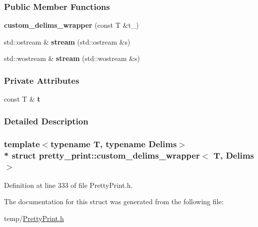 \subsubsection*{Public Member Functions}
\begin{DoxyCompactItemize}
\item 
{\bfseries custom\+\_\+delims\+\_\+wrapper} (const T \&t\+\_\+)\hypertarget{structpretty__print_1_1custom__delims__wrapper_a834f2b1779f2a832207def729955ee94}{}\label{structpretty__print_1_1custom__delims__wrapper_a834f2b1779f2a832207def729955ee94}

\item 
std\+::ostream \& {\bfseries stream} (std\+::ostream \&s)\hypertarget{structpretty__print_1_1custom__delims__wrapper_a29f5e10e26cf68312d14e2ecf446c42a}{}\label{structpretty__print_1_1custom__delims__wrapper_a29f5e10e26cf68312d14e2ecf446c42a}

\item 
std\+::wostream \& {\bfseries stream} (std\+::wostream \&s)\hypertarget{structpretty__print_1_1custom__delims__wrapper_a9f43467cfdc2714e9770c9a72e09896d}{}\label{structpretty__print_1_1custom__delims__wrapper_a9f43467cfdc2714e9770c9a72e09896d}

\end{DoxyCompactItemize}
\subsubsection*{Private Attributes}
\begin{DoxyCompactItemize}
\item 
const T \& {\bfseries t}\hypertarget{structpretty__print_1_1custom__delims__wrapper_a916612d2cadadde490c8ae65e24743fa}{}\label{structpretty__print_1_1custom__delims__wrapper_a916612d2cadadde490c8ae65e24743fa}

\end{DoxyCompactItemize}


\subsubsection{Detailed Description}
\subsubsection*{template$<$typename T, typename Delims$>$\\*
struct pretty\+\_\+print\+::custom\+\_\+delims\+\_\+wrapper$<$ T, Delims $>$}



Definition at line 333 of file Pretty\+Print.\+h.



The documentation for this struct was generated from the following file\+:\begin{DoxyCompactItemize}
\item 
temp/\hyperlink{PrettyPrint_8h}{Pretty\+Print.\+h}\end{DoxyCompactItemize}
